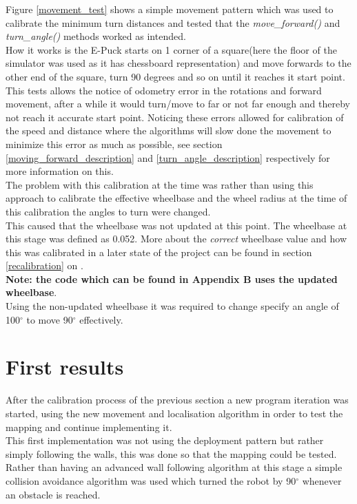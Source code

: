 Figure \ref{movement_test} shows a simple movement pattern which was used to calibrate the minimum turn distances and tested that the \textit{move\_forward()} and \textit{turn\_angle()} methods worked as intended. \\
How it works is the E-Puck starts on 1 corner of a square(here the floor of the simulator was used as it has chessboard representation) and move forwards to the other end of the square, turn 90 degrees and so on until it reaches it start point. This tests allows the notice of odometry error in the rotations and forward movement, after a while it would turn/move to far or not far enough and thereby not reach it accurate start point. Noticing these errors allowed for calibration of the speed and distance where the algorithms will slow done the movement to minimize this error as much as possible, see section \ref{moving_forward_description} and \ref{turn_angle_description} respectively for more information on this.\\[3ex]

The problem with this calibration at the time was rather than using this approach to calibrate the effective wheelbase and the wheel radius at the time of this calibration the angles to turn were changed.\\
This caused that the wheelbase was not updated at this point. The wheelbase at this stage was defined as  0.052. More about the \textit{correct} wheelbase value and how this was calibrated in a later state of the project can be found in section \ref{recalibration} on \pageref{recalibration}.\\ \textbf{Note: the code which can be found in Appendix B uses the updated wheelbase}.\\
Using the non-updated wheelbase it was required to change specify an angle of 100$^{\circ}$ to move 90$^{\circ}$ effectively.

\section{First results}
After the calibration process of the previous section a new program iteration was started, using the new movement and localisation algorithm in order to test the mapping and continue implementing it. \\[3ex]

This first implementation was not using the deployment pattern but rather simply following the walls, this was done so that the mapping could be tested. Rather than having an advanced wall following algorithm at this stage a simple collision avoidance algorithm was used which turned the robot by 90$^\circ$ whenever an obstacle is reached.

